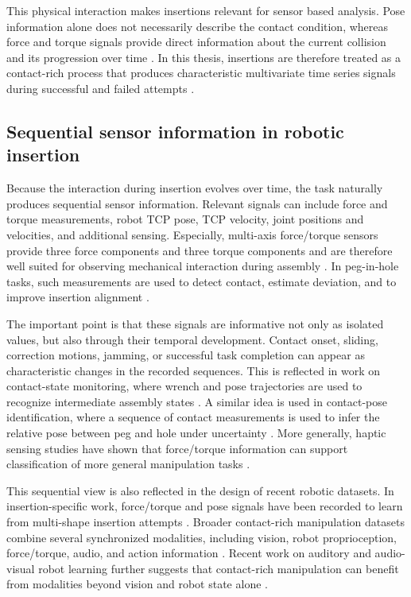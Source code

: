 This physical interaction makes insertions relevant for sensor based analysis. Pose information alone does not necessarily describe the contact condition, whereas force and torque signals provide direct information about the current collision and its progression over time \cite{jasimContactstateMonitoringForceguided2014,magistrisExperimentalForceTorqueDataset2018}. In this thesis, insertions are therefore treated as a contact-rich process that produces characteristic multivariate time series signals during successful and failed attempts \cite{magistrisExperimentalForceTorqueDataset2018,beltran-hernandezLearningForceControl2020}.

\subsection{Sequential sensor information in robotic insertion}

Because the interaction during insertion evolves over time, the task naturally produces sequential sensor information. Relevant signals can include force and torque measurements, robot TCP pose, TCP velocity, joint positions and velocities, and additional sensing. Especially, multi-axis force/torque sensors provide three force components and three torque components and are therefore well suited for observing mechanical interaction during assembly \cite{liMultiaxisForceTorque2025}. In peg-in-hole tasks, such measurements are used to detect contact, estimate deviation, and to improve insertion alignment \cite{tangAutonomousAlignmentPeg2016,abdullahForceTorqueData2015}.

The important point is that these signals are informative not only as isolated values, but also through their temporal development. Contact onset, sliding, correction motions, jamming, or successful task completion can appear as characteristic changes in the recorded sequences. This is reflected in work on contact-state monitoring, where wrench and pose trajectories are used to recognize intermediate assembly states \cite{jasimContactstateMonitoringForceguided2014}. A similar idea is used in contact-pose identification, where a sequence of contact measurements is used to infer the relative pose between peg and hole under uncertainty \cite{jinContactPoseIdentification2021a}. More generally, haptic sensing studies have shown that force/torque information can support classification of more general manipulation tasks \cite{chanEffectsForceTorqueTactile2019}.

This sequential view is also reflected in the design of recent robotic datasets. In insertion-specific work, force/torque and pose signals have been recorded to learn from multi-shape insertion attempts \cite{magistrisExperimentalForceTorqueDataset2018}. Broader contact-rich manipulation datasets combine several synchronized modalities, including vision, robot proprioception, force/torque, audio, and action information \cite{sliwowskiREASSEMBLEMultimodalDataset2025,fangRH20TComprehensiveRobotic2024}. Recent work on auditory and audio-visual robot learning further suggests that contact-rich manipulation can benefit from modalities beyond vision and robot state alone \cite{thankarajThatSoundsRight2023,mejiaHearingTouchAudioVisual2024b}.

